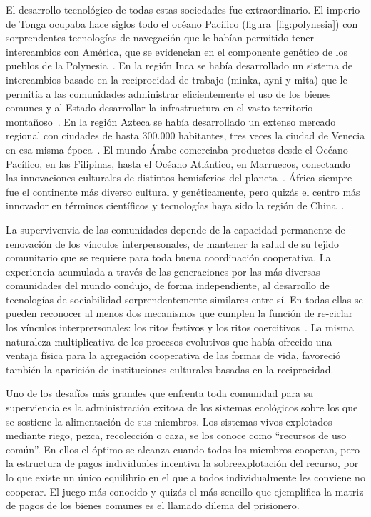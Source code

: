 \documentclass[a4paper,10pt]{book}
\begin{document}
El desarrollo tecnológico de todas estas sociedades fue extraordinario. 
El imperio de Tonga ocupaba hace siglos todo el oc\'eano Pac\'ifico (figura~\ref{fig:polynesia}) con sorprendentes tecnologías de navegación que le habían permitido tener intercambios con América, que se evidencian en el componente genético de los pueblos de la Polynesia~\cite{thorsby2016-polynesiaAmerica, ioannidis2020-polynesiaAmerica}.
En la región Inca se había desarrollado un sistema de intercambios basado en la reciprocidad de trabajo (minka, ayni y mita) que le permitía a las comunidades administrar eficientemente el uso de los bienes comunes y al Estado desarrollar la infrastructura en el vasto territorio montañoso~\cite{murra}.
En la región Azteca se había desarrollado un extenso mercado regional con ciudades de hasta 300.000 habitantes, tres veces la ciudad de Venecia en esa misma época~\cite{www7.uc.cl}. %
El mundo \'Arabe comerciaba productos desde el Océano Pacífico, en las Filipinas, hasta el Oc\'eano Atl\'antico, en Marruecos, conectando las innovaciones culturales de distintos hemisferios del planeta~\cite{dussel}.
África siempre fue el continente más diverso cultural y genéticamente, pero quizás el centro más innovador en términos científicos y tecnologías haya sido la región de China~\cite{needham2004-generalConclusionsAndReflections}.


La supervivenvia de las comunidades depende de la capacidad permanente de renovación de los vínculos interpersonales, de mantener la salud de su tejido comunitario que se requiere para toda buena coordinación cooperativa.
La experiencia acumulada a través de las generaciones por las más diversas comunidades del mundo condujo, de forma independiente, al desarrollo de tecnologías de sociabilidad sorprendentemente similares entre sí.
En todas ellas se pueden reconocer al menos dos mecanismos que cumplen la función de re-ciclar los v\'inculos interprersonales: los ritos festivos y los ritos coercitivos~\cite{segato2016-guerraContraLasMujeres}.
La misma naturaleza multiplicativa de los procesos evolutivos que había ofrecido una ventaja física para la agregación cooperativa de las formas de vida, favoreció también la aparición de instituciones culturales basadas en la reciprocidad.


Uno de los desafíos más grandes que enfrenta toda comunidad para su superviencia es la administración exitosa de los sistemas ecológicos sobre los que se sostiene la alimentación de sus miembros.
Los sistemas vivos explotados mediante riego, pezca, recolección o caza, se los conoce como ``recursos de uso común''.
En ellos el óptimo se alcanza cuando todos los miembros cooperan, pero la estructura de pagos individuales incentiva la sobreexplotación del recurso, por lo que existe un único equilibrio en el que a todos individualmente les conviene no cooperar.
El juego más conocido y quizás el más sencillo que ejemplifica la matriz de pagos de los bienes comunes es el llamado dilema del prisionero.
\end{document}
